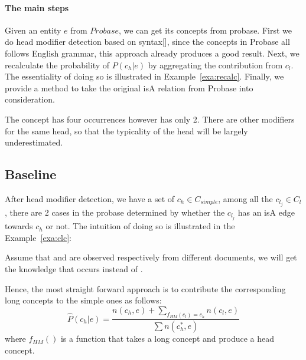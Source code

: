 
\paragraph{The main steps}
Given an entity $e$ from $Probase$, we can get its concepts from probase. First we do head modifier detection based on syntax[], since the concepts in Probase all follows English grammar, this approach already produces a good result. Next, we recalculate the probability of $P({c_h}|e)$ by aggregating the contribution from $c_l$. The essentiality of doing so is illustrated in Example~\ref{exa:recalc}. Finally, we provide a method to take the original isA relation from Probase into consideration.




\begin{example}
\label{exa:recalc}
 The concept has four occurrences however  has only 2. There are other modifiers for the same head, so that the typicality of the head will be largely underestimated.
\end{example}



\subsection{Baseline}
After head modifier detection, we have a set of ${c_h} \in C_{simple}$, among all the $c_{l_j}\in C_{l}$, there are 2 cases in the probase determined by whether the $c_{l_j}$ has an isA edge towards ${c_h}$ or not.
The intuition of doing so is illustrated in the Example~\ref{exa:clc}:

\begin{example}
\label{exa:clc}
Assume that   and  are observed respectively  from different documents, we will get the knowledge that  occurs  instead of .
\end{example}

Hence, the most straight forward approach is to contribute the corresponding long concepts to the simple ones as follows:
$$\hat{P}(c_h|e)=\frac{n(c_h,e)+\sum_{ f_{HM}(c_l)=c_h} n(c_l,e)}{ \sum n(c_h^*,e)} $$
where $f_{HM}()$ is a function that takes a long concept and produce a head concept.

